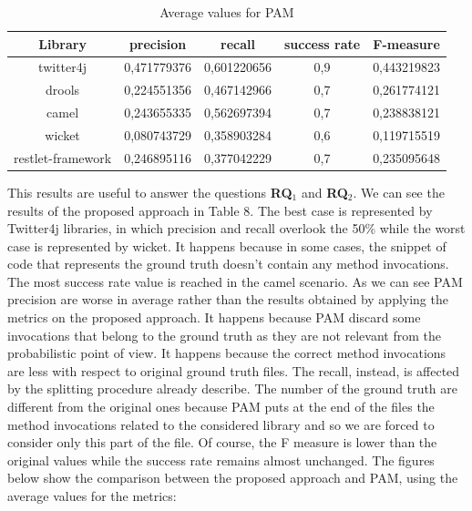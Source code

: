  
 \begin{table}[H]
  \caption{ Average values for PAM}
  \label{Table:4}
 \begin{center}
\begin{tabular}{|c|c|c|c|c|}
\hline
 \textbf{Library} & \textbf{precision}  & \textbf{recall} & \textbf{success rate} & \textbf{F-measure} \\ 
\hline
 twitter4j & 0,471779376  & 0,601220656 & 0,9  & 0,443219823  \\
\hline
drools & 0,224551356 & 0,467142966   & 0,7 & 0,261774121 \\
\hline
camel & 0,243655335  & 0,562697394 & 0,7 & 0,238838121 \\
\hline 
wicket &0,080743729  & 0,358903284 &  0,6 & 0,119715519  \\
\hline
restlet-framework & 0,246895116  & 0,377042229 & 0,7 & 0,235095648 \\
\hline
\end{tabular}
\end{center}
\end{table} 
This results are useful to answer the questions \textbf{RQ$_1$} and \textbf{RQ$_2$}. We can see the results of the proposed approach in Table 8. The best case is represented by Twitter4j libraries, in which precision and recall overlook the 50\% while the worst case is represented by wicket. It happens because in some cases, the snippet of code that represents the ground truth doesn't contain any method invocations. The most success rate value is reached in the camel scenario.
As we can see PAM precision are worse in average rather than the results obtained by applying the metrics on the proposed approach. It happens because PAM discard some invocations that belong to the ground truth as they are not relevant from the probabilistic point of view. It happens because the correct method invocations are less with respect to original ground truth files. The recall, instead, is affected by the splitting procedure already describe. The number of the ground truth are different from the original ones because PAM puts at the end of the files the method invocations related to the considered library and so we are forced to consider only this part of the file. Of course, the F measure is lower than the original values while the success rate remains almost unchanged. The figures below show the comparison between the proposed approach and PAM, using the average values for the metrics:\\

